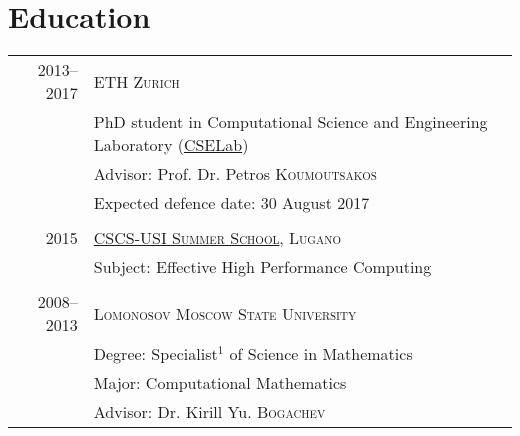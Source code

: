 \documentclass[a4paper,10pt]{article}
\begin{document}
\section{Education}
\begin{tabular}{r|p{13cm}}
    2013--2017 & \textsc{ETH Zurich} \\
    & PhD student in Computational Science and Engineering
    Laboratory (\href{http://cse-lab.ethz.ch}{CSELab}) \\
    & Advisor: Prof. Dr. Petros \textsc{Koumoutsakos} \\
    & Expected defence date: 30 August 2017 \\

    \multicolumn{2}{c}{} \\

    2015 & \textsc{\href{http://www.cscs.ch/fileadmin/events/Flyer_Summer_School_2015.pdf}{CSCS-USI Summer School}, Lugano} \\
    & Subject: Effective High Performance Computing \\

    \multicolumn{2}{c}{} \\

    2008--2013 & \textsc{Lomonosov Moscow State University} \\
    & Degree: Specialist$^1\!\!$ of Science in Mathematics\\
    & Major: Computational Mathematics\\
    & Advisor: Dr. Kirill Yu. \textsc{Bogachev}\\






\end{tabular}
\linebreak
\end{document}
